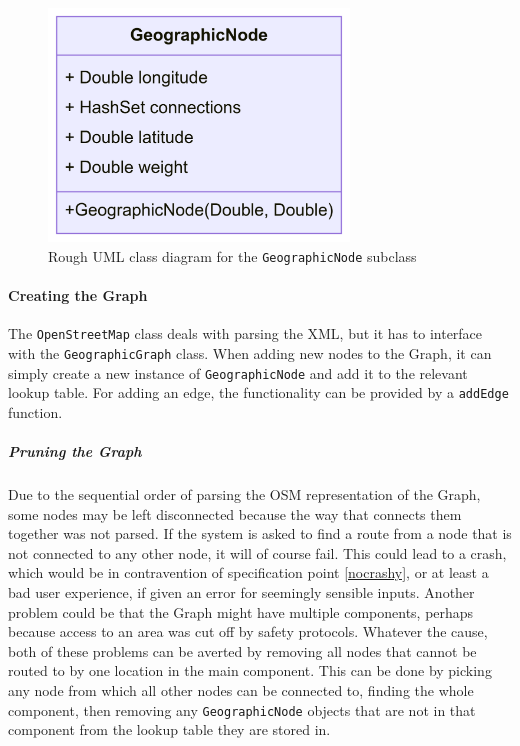 \documentclass[11pt,twoside,a4paper]{article}
\begin{document}
\begin{figure}[t]
    \begin{center}
        \includegraphics[width=8cm]{GeographicNode.png}
    \end{center}
    \caption{Rough UML class diagram for the \texttt{GeographicNode} subclass}
    \label{geographicnode}
\end{figure}
\paragraph{Creating the Graph}
The \texttt{OpenStreetMap} class deals with parsing the XML, but it has to interface with the \texttt{GeographicGraph} class. When adding new nodes to the Graph, it can simply create a new instance of 
\texttt{GeographicNode} and add it to the relevant lookup table. For adding an edge, the functionality can be provided by a \texttt{addEdge} function. 
\subparagraph{Pruning the Graph}
Due to the sequential order of parsing the OSM representation of the Graph, some nodes may be left disconnected because the way that connects them together was not parsed. If the system is asked to find a route from a 
node that is not connected to any other node, it will of course fail. This could lead to a crash, which would be in contravention of specification point \ref{nocrashy}, or at least a bad user experience, if given an error for seemingly sensible inputs.
Another problem could be that the Graph might have multiple components, perhaps because access to an area was cut off by safety protocols. Whatever the cause, both of these problems can be averted by removing all nodes that cannot be routed to by one location in the 
main component. This can be done by picking any node from which all other nodes can be connected to, finding the whole component, then removing any \texttt{GeographicNode} objects that are not in that component from the lookup table they are stored in.
\end{document}
